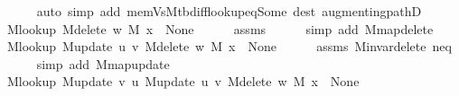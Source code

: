 \begin{isabellebody}
\ \ \ \ \isamarkupfalse%
\ {\isacharparenleft}{\kern0pt}auto\ simp\ add{\isacharcolon}{\kern0pt}\ mem{\isacharunderscore}{\kern0pt}Vs{\isacharunderscore}{\kern0pt}M{\isacharunderscore}{\kern0pt}tbd{\isacharunderscore}{\kern0pt}iff{\isacharunderscore}{\kern0pt}lookup{\isacharunderscore}{\kern0pt}eq{\isacharunderscore}{\kern0pt}Some\ dest{\isacharcolon}{\kern0pt}\ augmenting{\isacharunderscore}{\kern0pt}pathD{\isacharparenleft}{\kern0pt}{}{\isacharparenright}{\kern0pt}{\isacharparenright}{\kern0pt}\isanewline
\ \ \isamarkupfalse%
\ {\isachardoublequoteopen}M{\isacharunderscore}{\kern0pt}lookup\ {\isacharparenleft}{\kern0pt}M{\isacharunderscore}{\kern0pt}delete\ w\ M{\isacharparenright}{\kern0pt}\ {\isacharquery}{\kern0pt}x\ {\isacharequal}{\kern0pt}\ None{\isachardoublequoteclose}\isanewline
\ \ \ \ \isamarkupfalse%
\ assms{\isacharparenleft}{\kern0pt}{}{\isacharparenright}{\kern0pt}\isanewline
\ \ \ \ \isamarkupfalse%
\ {\isacharparenleft}{\kern0pt}simp\ add{\isacharcolon}{\kern0pt}\ M{\isachardot}{\kern0pt}map{\isacharunderscore}{\kern0pt}delete{\isacharparenright}{\kern0pt}\isanewline
\ \ \isamarkupfalse%
\ {\isachardoublequoteopen}M{\isacharunderscore}{\kern0pt}lookup\ {\isacharparenleft}{\kern0pt}M{\isacharunderscore}{\kern0pt}update\ u\ v\ {\isacharparenleft}{\kern0pt}M{\isacharunderscore}{\kern0pt}delete\ w\ M{\isacharparenright}{\kern0pt}{\isacharparenright}{\kern0pt}\ {\isacharquery}{\kern0pt}x\ {\isacharequal}{\kern0pt}\ None{\isachardoublequoteclose}\isanewline
\ \ \ \ \isamarkupfalse%
\ assms{\isacharparenleft}{\kern0pt}{}{\isacharparenright}{\kern0pt}\ M{\isachardot}{\kern0pt}invar{\isacharunderscore}{\kern0pt}delete\ neq{\isacharparenleft}{\kern0pt}{}{\isacharparenright}{\kern0pt}\isanewline
\ \ \ \ \isamarkupfalse%
\ {\isacharparenleft}{\kern0pt}simp\ add{\isacharcolon}{\kern0pt}\ M{\isachardot}{\kern0pt}map{\isacharunderscore}{\kern0pt}update{\isacharparenright}{\kern0pt}\isanewline
\ \ \isamarkupfalse%
\ {\isachardoublequoteopen}M{\isacharunderscore}{\kern0pt}lookup\ {\isacharparenleft}{\kern0pt}M{\isacharunderscore}{\kern0pt}update\ v\ u\ {\isacharparenleft}{\kern0pt}M{\isacharunderscore}{\kern0pt}update\ u\ v\ {\isacharparenleft}{\kern0pt}M{\isacharunderscore}{\kern0pt}delete\ w\ M{\isacharparenright}{\kern0pt}{\isacharparenright}{\kern0pt}{\isacharparenright}{\kern0pt}\ {\isacharquery}{\kern0pt}x\ {\isacharequal}{\kern0pt}\ None{\isachardoublequoteclose}\isanewline

\end{isabellebody}
